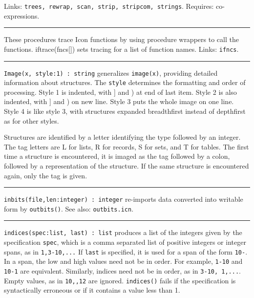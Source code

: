 Links: \texttt{trees, rewrap, scan, strip, stripcom, strings}. Requires:
co-expressions.

\vspace{0.25cm}\hrule{}

These procedures trace Icon functions by using procedure
wrappers to call the functions. iftrace(fncs[]) sets tracing for a list
of function names. Links: \texttt{ifncs}.

\vspace{0.25cm}\hrule{}

\texttt{Image(x, style:1) : string} generalizes
\texttt{image(x)}, providing detailed information about structures. The
\texttt{style} determines the formatting and order of
processing. Style 1 is indented, with ] and ) at end of last item.
Style 2 is also indented, with ] and ) on new line. Style 3 puts the
whole image on one line. Style 4 is like style 3, with structures
expanded breadthfirst instead of depthfirst as for other styles.

Structures are identified by a letter identifying the type followed by
an integer. The tag letters are {\textquotedbl}L{\textquotedbl} for
lists, {\textquotedbl}R{\textquotedbl} for records,
{\textquotedbl}S{\textquotedbl} for sets, and
{\textquotedbl}T{\textquotedbl} for tables. The first time a structure
is encountered, it is imaged as the tag followed by a colon, followed
by a representation of the structure. If the same structure is
encountered again, only the tag is given.

\vspace{0.25cm}\hrule{}

\texttt{inbits(file,len:integer) : integer} re-imports data converted
into writable form by \texttt{outbits()}. See also:
\texttt{outbits.icn}.

\vspace{0.25cm}\hrule{}

\texttt{indices(spec:list, last) : list} produces a list of the integers
given by the specification \texttt{spec}, which is a comma separated
list of positive integers or integer spans, as in
\texttt{{\textquotedbl}1,3-10,...{\textquotedbl}} If \texttt{last} is
specified, it is used for a span of the form
\texttt{{\textquotedbl}10-{\textquotedbl}}. In a span, the low and high
values need not be in order. For example,
\texttt{{\textquotedbl}1-10{\textquotedbl}} and
\texttt{{\textquotedbl}10-1{\textquotedbl}} are equivalent. Similarly,
indices need not be in order, as in \texttt{{\textquotedbl}3-10,
1,...{\textquotedbl}}. Empty values, as in
\texttt{{\textquotedbl}10,,12{\textquotedbl}} are ignored.
\texttt{indices()} fails if the specification is syntactically
erroneous or if it contains a value less than 1. 

